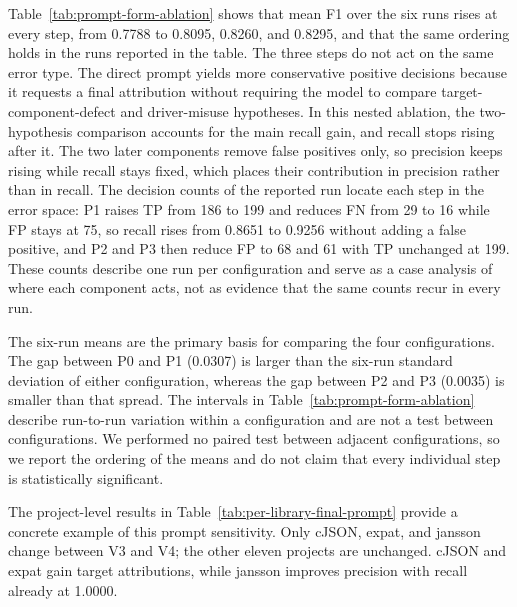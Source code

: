 \documentclass[pdflatex,sn-basic]{sn-jnl}%
\theoremstyle{thmstyleone}%
\theoremstyle{thmstyletwo}%
\theoremstyle{thmstylethree}%
\begin{document}
Table~\ref{tab:prompt-form-ablation} shows that {\color{blue}mean F1 over the six runs rises at every step, from 0.7788 to 0.8095, 0.8260, and 0.8295, and that the same ordering holds in the runs reported in the table. The three steps do not act on the same error type}. The direct prompt yields more conservative positive decisions because it requests a final attribution without requiring the model to compare target-component-defect and driver-misuse hypotheses. {\color{blue}In this nested ablation, the two-hypothesis comparison accounts for the main recall gain, and recall stops rising after it. The two later components remove false positives only, so precision keeps rising while recall stays fixed, which places their contribution in precision rather than in recall. The decision counts of the reported run locate each step in the error space: P1 raises TP from 186 to 199 and reduces FN from 29 to 16 while FP stays at 75, so recall rises from 0.8651 to 0.9256 without adding a false positive, and P2 and P3 then reduce FP to 68 and 61 with TP unchanged at 199. These counts describe one run per configuration and serve as a case analysis of where each component acts, not as evidence that the same counts recur in every run.}

{\color{blue}
The six-run means are the primary basis for comparing the four configurations. The gap between P0 and P1 (0.0307) is larger than the six-run standard deviation of either configuration, whereas the gap between P2 and P3 (0.0035) is smaller than that spread. The intervals in Table~\ref{tab:prompt-form-ablation} describe run-to-run variation within a configuration and are not a test between configurations. We performed no paired test between adjacent configurations, so we report the ordering of the means and do not claim that every individual step is statistically significant.
}

The project-level results in Table~\ref{tab:per-library-final-prompt} provide a concrete example of this prompt sensitivity. {\color{blue}Only cJSON, expat, and jansson change between V3 and V4; the other eleven projects are unchanged. cJSON and expat gain target attributions, while jansson improves precision with recall already at 1.0000.}
\end{document}
